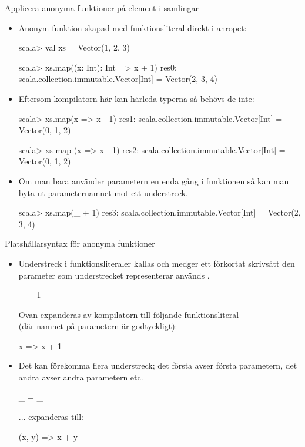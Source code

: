 \begin{Slide}{Applicera anonyma funktioner på element i samlingar}\SlideFontSmall
\begin{itemize}
\item Anonym funktion skapad med funktionsliteral direkt i anropet:
\begin{REPL}
scala> val xs = Vector(1, 2, 3)

scala> xs.map((x: Int): Int => x + 1)
res0: scala.collection.immutable.Vector[Int] = Vector(2, 3, 4)
\end{REPL}
\item Eftersom kompilatorn här kan härleda typerna så behövs de inte:
\begin{REPL}
scala> xs.map(x => x - 1)
res1: scala.collection.immutable.Vector[Int] = Vector(0, 1, 2)

scala> xs map (x => x - 1)
res2: scala.collection.immutable.Vector[Int] = Vector(0, 1, 2)

\end{REPL}
\item Om man bara använder parametern en enda gång i funktionen så kan man byta ut parameternamnet mot ett understreck.

\begin{REPL}
scala> xs.map(_ + 1)
res3: scala.collection.immutable.Vector[Int] = Vector(2, 3, 4)
\end{REPL}
\end{itemize}
\end{Slide}



\begin{Slide}{Platshållarsyntax för anonyma funktioner}\SlideFontSmall
\begin{itemize}
\item Understreck i funktionsliteraler kallas   och medger ett förkortat skrivsätt  den parameter som understrecket representerar används .

\begin{Code}[basicstyle=\ttfamily\fontsize{10}{12}\selectfont]
_ + 1
\end{Code}
Ovan expanderas av kompilatorn till följande funktionsliteral \\(där namnet på parametern är godtyckligt):
\begin{Code}[basicstyle=\ttfamily\fontsize{10}{12}\selectfont]
x => x + 1
\end{Code}
\pause
\item Det kan förekomma flera understreck; det första avser första parametern, det andra avser andra parametern etc.
\begin{Code}[basicstyle=\ttfamily\fontsize{10}{12}\selectfont]
_ + _
\end{Code}
... expanderas till:
\begin{Code}[basicstyle=\ttfamily\fontsize{10}{12}\selectfont]
(x, y) => x + y
\end{Code}

\end{itemize}
\end{Slide}


